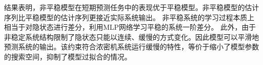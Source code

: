 

结果表明，非平稳模型在短期预测任务中的表现优于平稳模型。非平稳模型的估计序列比平稳模型的估计序列更接近实际系统输出。
非平稳系统的学习过程本质上相当于对隐状态进行差分，利用MLP网络学习平稳的系统一阶差分。
此外，由于非稳定系统结构限制了隐状态只能以连续、缓慢的方式变化。因此模型可以平滑地预测系统的输出。该约束符合浓密机系统运行缓慢的特性，等价于缩小了模型参数的搜索空间，抑制了模型过拟合的情况。

